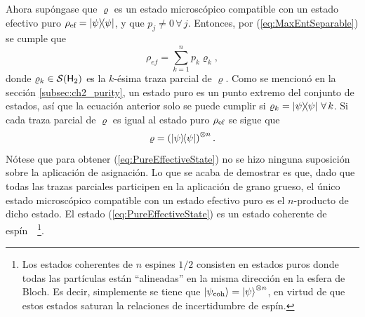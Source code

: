 Ahora supóngase que $\varrho$ es un estado microscópico compatible con un estado efectivo puro $\rho_{\ef}=\dyad{\psi}$, y que $p_{j}\neq 0\,\forall\,j$. Entonces, por (\ref{eq:MaxEntSeparable}) se cumple que
\begin{equation}
    \rho_{ef}=\sum_{k=1}^{n}p_{k}\varrho_{k},\nonumber
\end{equation}
donde $\varrho_{k}\in\mathcal{S}({\sf H}_{2})$ es la $k$-ésima traza parcial de $\varrho$. Como se mencionó en la sección \ref{subsec:ch2_purity}, un estado puro es un punto extremo del conjunto de estados, así que la ecuación anterior solo se puede cumplir si $\varrho_{k}=\dyad{\psi}\,\forall\,k$.  Si cada traza parcial de $\varrho$ es igual al estado puro $\rho_{\text{ef}}$ se sigue que
\begin{equation}\label{eq:PureEffectiveState}
    \varrho=\left(\dyad{\psi}\right)^{\otimes n}.
\end{equation}
Nótese que para obtener (\ref{eq:PureEffectiveState}) no se hizo ninguna suposición sobre la aplicación de asignación. Lo que se acaba de demostrar es que, dado que todas las trazas parciales participen en la aplicación de grano grueso, el único estado microscópico compatible con un estado efectivo puro es el $n$-producto de dicho estado. El estado (\ref{eq:PureEffectiveState}) es un estado coherente de espín~\cite{klimovbook}~\footnote{Los estados coherentes de $n$ espines $1/2$ consisten en estados puros donde todas las partículas están ``alineadas'' en la misma dirección en la esfera de Bloch. Es decir, simplemente se tiene que $\ket{\psi_\text{coh}}=\ket\psi^{\otimes n}$, en virtud de que estos estados saturan la relaciones de incertidumbre de espín.}.
